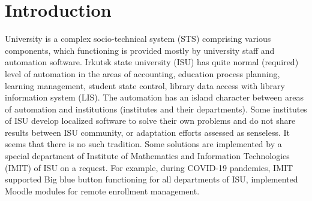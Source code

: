 \documentclass[
]{ceurart}
\begin{document}
\maketitle


\section{Introduction}

University is a complex socio-technical system (STS) \cite{zh2020} comprising various components, which functioning is provided mostly by university staff and automation software.  Irkutsk state university (ISU) has quite normal (required) level of automation in the areas of accounting, education process planning, learning management, student state control, library data access with library information system (LIS).  The automation has an island character between areas of automation and institutions (institutes and their departments).  Some institutes of ISU develop localized software to solve their own problems and do not share results between ISU community, or adaptation efforts assessed as senseless. It seems that there is no such tradition.  Some solutions are implemented by a special department of Institute of Mathematics and Information Technologies (IMIT) of ISU on a request.  For example, during COVID-19 pandemics, IMIT supported Big blue button functioning for all departments of ISU, implemented Moodle modules for remote enrollment management.

\end{document}
